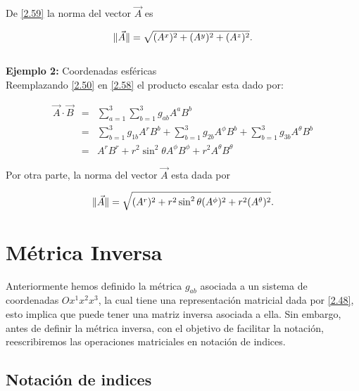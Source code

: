 \documentclass[12pt]{report}
\DeclarePairedDelimiter\norm{\lVert}{\rVert}
\begin{document}
De \eqref{2.59} la norma del vector $\vec{A}$ es

\begin{equation}
\norm{\vec{A}}= \sqrt{(A^x)^2 + (A^y)^2 + (A^z)^2}.
\end{equation}
\\

\textbf{Ejemplo 2:} Coordenadas esféricas \\

Reemplazando \eqref{2.50} en \eqref{2.58} el producto escalar esta dado por:

\begin{eqnarray}\nonumber
\vec{A} \cdot \vec{B}&=& \displaystyle\sum_{a=1}^3 \sum_{b=1}^3 g_{ab} A^a B^b \\ \nonumber
&=& \displaystyle\sum_{b=1}^3 g_{1b} A^r B^b + \displaystyle\sum_{b=1}^3 g_{2b} A^{\phi} B^b + \displaystyle\sum_{b=1}^3 g_{3b} A^{\theta} B^b\\
&=& A^r B^r + r^2 \sin^2\theta A^{\phi} B^{\phi} +  r^2 A^{\theta} B^{\theta}
\end{eqnarray}

Por otra parte, la norma del vector $\vec{A}$ esta dada por 

\begin{equation}
\norm{\vec{A}}= \sqrt{(A^r)^2 + r^2 \sin^2\theta (A^{\phi})^2 + r^2 (A^{\theta})^2}.
\end{equation}











\section{Métrica Inversa}

Anteriormente hemos definido la métrica $g_{ab}$ asociada a un sistema de coordenadas $O x^1 x^2 x^3$, la cual tiene una representación matricial dada por \eqref{2.48}, esto implica que puede tener una matriz inversa asociada a ella. Sin embargo, antes de definir la métrica inversa, con el objetivo de facilitar la notación, reescribiremos las operaciones matriciales en notación de indices. \\

\subsection{Notación de indices}
\end{document}
